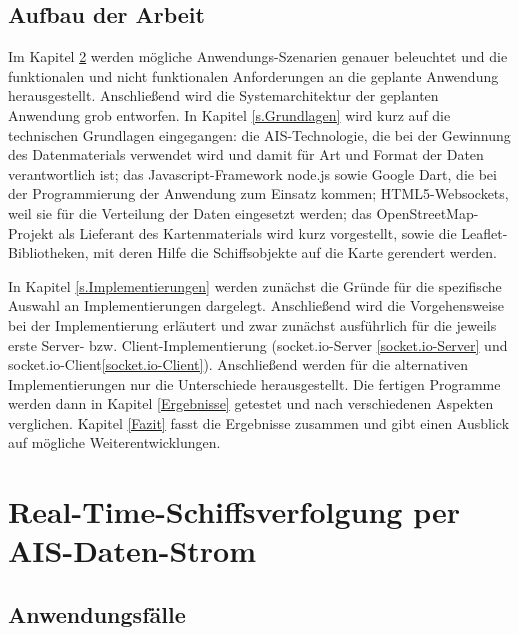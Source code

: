 \section{Aufbau der Arbeit}\label{s.Aufbau der Arbeit}
Im Kapitel \ref{c.Realtime-Schiffsverfolgung per AIS-Daten-Strom} werden mögliche Anwendungs-Szenarien genauer beleuchtet und die funktionalen und nicht funktionalen Anforderungen an die geplante Anwendung herausgestellt. Anschließend wird die Systemarchitektur der geplanten Anwendung grob entworfen.
In Kapitel \ref{s.Grundlagen} wird kurz auf die technischen Grundlagen eingegangen: die AIS-Technologie, die bei der Gewinnung des Datenmaterials verwendet wird und damit für Art und Format der Daten verantwortlich ist; das Javascript-Framework node.js sowie Google Dart, die bei der Programmierung der Anwendung zum Einsatz kommen; HTML5-Websockets, weil sie für die Verteilung der Daten eingesetzt werden; das OpenStreetMap-Projekt als Lieferant des Kartenmaterials wird kurz vorgestellt, sowie die Leaflet-Bibliotheken, mit deren Hilfe die Schiffsobjekte auf die Karte gerendert werden.

In Kapitel \ref{s.Implementierungen} werden zunächst die Gründe für die spezifische Auswahl an Implementierungen dargelegt. Anschließend wird die Vorgehensweise bei der Implementierung erläutert und zwar zunächst ausführlich für die jeweils erste Server- bzw. Client-Implementierung (socket.io-Server \ref{socket.io-Server} und socket.io-Client\ref{socket.io-Client}). Anschließend werden für die alternativen Implementierungen nur die Unterschiede herausgestellt. Die fertigen Programme werden dann in Kapitel \ref{Ergebnisse} getestet und nach verschiedenen Aspekten verglichen.
Kapitel \ref{Fazit} fasst die Ergebnisse zusammen und gibt einen Ausblick auf mögliche Weiterentwicklungen.


\chapter{Real-Time-Schiffsverfolgung per AIS-Daten-Strom}\label{c.Realtime-Schiffsverfolgung per AIS-Daten-Strom}

\section{ Anwendungsfälle}\label{s.Anwendungsfälle}

